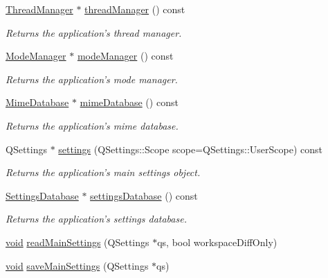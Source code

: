 \begin{DoxyCompactItemize}
\hyperlink{class_core_1_1_thread_manager}{\-Thread\-Manager} $\ast$ \hyperlink{group___core_plugin_ga1470c6f48fe51c11e5ac124ab6163e98}{thread\-Manager} () const 
\begin{DoxyCompactList}\small\item\em \-Returns the application's thread manager. \end{DoxyCompactList}\item 
\hyperlink{class_core_1_1_mode_manager}{\-Mode\-Manager} $\ast$ \hyperlink{group___core_plugin_ga44ed1e705d67281a9f15bf01533170ec}{mode\-Manager} () const 
\begin{DoxyCompactList}\small\item\em \-Returns the application's mode manager. \end{DoxyCompactList}\item 
\hyperlink{class_core_1_1_mime_database}{\-Mime\-Database} $\ast$ \hyperlink{group___core_plugin_ga95eea00c6e3a6ddfa8c30bfb6235068e}{mime\-Database} () const 
\begin{DoxyCompactList}\small\item\em \-Returns the application's mime database. \end{DoxyCompactList}\item 
\-Q\-Settings $\ast$ \hyperlink{group___core_plugin_ga478630bd5faf6a57e817f6f6391a3780}{settings} (\-Q\-Settings\-::\-Scope scope=\-Q\-Settings\-::\-User\-Scope) const 
\begin{DoxyCompactList}\small\item\em \-Returns the application's main settings object. \end{DoxyCompactList}\item 
\hyperlink{class_core_1_1_settings_database}{\-Settings\-Database} $\ast$ \hyperlink{group___core_plugin_ga71a160a5db09558d4629b0b9c185a773}{settings\-Database} () const 
\begin{DoxyCompactList}\small\item\em \-Returns the application's settings database. \end{DoxyCompactList}\item 
\hyperlink{group___u_a_v_objects_plugin_ga444cf2ff3f0ecbe028adce838d373f5c}{void} \hyperlink{group___core_plugin_ga5b6aedac3eba640d03e579135c0e2b6d}{read\-Main\-Settings} (\-Q\-Settings $\ast$qs, bool workspace\-Diff\-Only)
\item 
\hyperlink{group___u_a_v_objects_plugin_ga444cf2ff3f0ecbe028adce838d373f5c}{void} \hyperlink{group___core_plugin_ga491739a4473f47efb06633f80e1eb8c3}{save\-Main\-Settings} (\-Q\-Settings $\ast$qs)

\end{DoxyCompactItemize}

